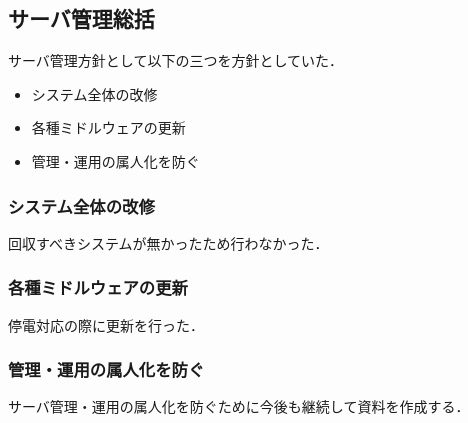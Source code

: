 \subsection*{サーバ管理総括}


サーバ管理方針として以下の三つを方針としていた．
\begin{itemize}
    \item システム全体の改修
    \item 各種ミドルウェアの更新
    \item 管理・運用の属人化を防ぐ
\end{itemize}

\subsubsection*{システム全体の改修}
回収すべきシステムが無かったため行わなかった．

\subsubsection*{各種ミドルウェアの更新}
停電対応の際に更新を行った．

\subsubsection*{管理・運用の属人化を防ぐ}
サーバ管理・運用の属人化を防ぐために今後も継続して資料を作成する．
